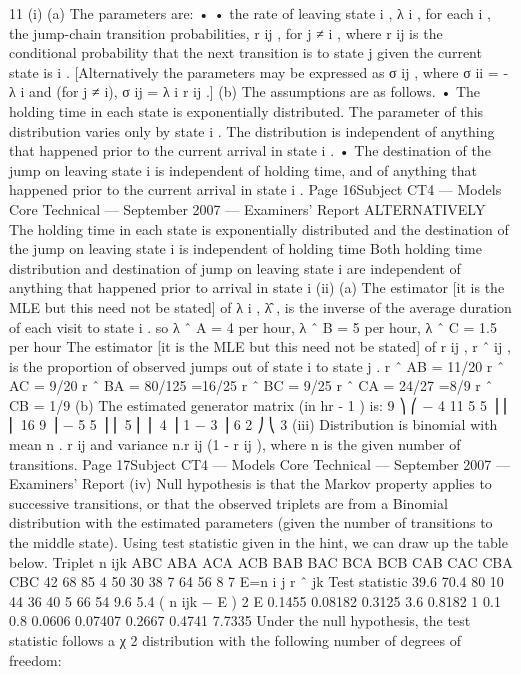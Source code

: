 \documentclass[a4paper,12pt]{article}
\begin{document}
\begin{enumerate}
11
(i)
(a)
The parameters are:
•
•
the rate of leaving state i , λ i , for each i ,
the jump-chain transition probabilities, r ij , for j ≠ i , where r ij is the
conditional probability that the next transition is to state j given the
current state is i .
[Alternatively the parameters may be expressed as σ ij , where σ ii = - λ i
and (for j ≠ i), σ ij = λ i r ij .]
(b)
The assumptions are as follows.
• The holding time in each state is exponentially distributed. The
parameter of this distribution varies only by state i . The
distribution is independent of anything that happened prior to the
current arrival in state i .
• The destination of the jump on leaving state i is independent of
holding time, and of anything that happened prior to the current
arrival in state i .
Page 16Subject CT4 — Models Core Technical — September 2007 — Examiners’ Report
ALTERNATIVELY
The holding time in each state is exponentially distributed and the
destination of the jump on leaving state i is independent of holding
time
Both holding time distribution and destination of jump on leaving state
i are independent of anything that happened prior to arrival in state i
(ii)
(a)
The estimator [it is the MLE but this need not
be stated] of λ i , λ̂ , is the inverse of the average duration of each visit
to state i .
so λ ˆ A = 4 per hour, λ ˆ B = 5 per hour, λ ˆ C = 1.5 per hour
The estimator [it is the MLE but this need not be stated] of r ij , r ˆ ij , is
the proportion of observed jumps out of state i to state j .
r ˆ AB = 11/20
r ˆ AC = 9/20
r ˆ BA = 80/125 =16/25
r ˆ BC = 9/25
r ˆ CA = 24/27 =8/9
r ˆ CB = 1/9
(b)
The estimated generator matrix (in hr - 1 ) is:
9 ⎞
⎛ − 4 11
5
5 ⎟
⎜
⎜ 16
9 ⎟
− 5
5 ⎟
⎜ 5
⎜ ⎜ 4
⎟
1
− 3 ⎟
6
2 ⎠
⎝ 3
(iii)
Distribution is binomial with mean n . r ij and variance n.r ij
(1 - r ij ), where n is the given number of transitions.
Page 17Subject CT4 — Models Core Technical — September 2007 — Examiners’ Report
(iv)
Null hypothesis is that the Markov property applies to successive transitions,
or that the observed triplets are from a Binomial distribution with the
estimated parameters (given the number of transitions to the middle state).
Using test statistic given in the hint, we can draw up the table below.
Triplet n ijk
ABC
ABA
ACA
ACB
BAB
BAC
BCA
BCB
CAB
CAC
CBA
CBC 42
68
85
4
50
30
38
7
64
56
8
7
E=n i j r ˆ jk
Test statistic
39.6
70.4
80
10
44
36
40
5
66
54
9.6
5.4
( n ijk − E ) 2
E
0.1455
0.08182
0.3125
3.6
0.8182
1
0.1
0.8
0.0606
0.07407
0.2667
0.4741
7.7335
Under the null hypothesis, the test statistic follows a χ 2 distribution with the
following number of degrees of freedom:

\end{enumerate}
\end{document}
